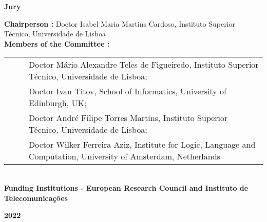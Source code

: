 \begin{flushleft}
    \large \textbf{Jury}\\
    \vspace{3mm}
    \raggedright\large \textbf{Chairperson :} Doctor Isabel Maria Martins Cardoso, Instituto Superior Técnico, Universidade de Lisboa\\
    \vspace{3mm}
    \large \textbf{Members of the Committee :}\\ %
    \vspace{3mm}
    \begin{minipage}{\textwidth}
        \begin{tabularx}{1.1\textwidth}{ l @{ } p{} }
            ~~~ & Doctor Mário Alexandre Teles de Figueiredo, Instituto Superior Técnico, Universidade de Lisboa;                  \\
                & Doctor Ivan Titov, School of Informatics, University of Edinburgh, UK;                                           \\
                & Doctor André Filipe Torres Martins, Instituto Superior Técnico, Universidade de Lisboa;                          \\
                & Doctor Wilker Ferreira Aziz, Institute for Logic, Language and Computation, University of Amsterdam, Netherlands \\
        \end{tabularx}
    \end{minipage}\\
    \centering
    \vspace{5mm}\large \textbf{Funding Institutions - European Research Council and Instituto de Telecomunicações}\\
    \vspace{10mm}

    \large \textbf{2022} \\
    \let\thepage\relax
\end{flushleft}
\pagebreak
